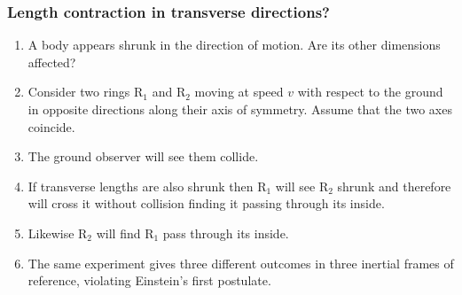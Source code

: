 \documentclass{beamer}
\begin{document}
\begin{frame}
\frametitle{Length contraction in transverse directions?}
\begin{enumerate}
\item A body appears shrunk in the direction of motion. Are its other dimensions
affected?
\item Consider two rings R$_{1}$ and R$_{2}$ moving at speed $v$ with respect
to the ground in opposite directions along their axis of symmetry. Assume that
the two axes coincide.
\item The ground observer will see them collide.
\item If transverse lengths are also shrunk then R$_{1}$ will see R$_{2}$ shrunk
and therefore will cross it without collision finding it passing through its
inside.
\item Likewise R$_{2}$ will find R$_{1}$ pass through its inside.
\item The same experiment gives three different outcomes in three inertial
frames of reference, violating Einstein's first postulate.
\end{enumerate}
\end{frame}
\end{document}
